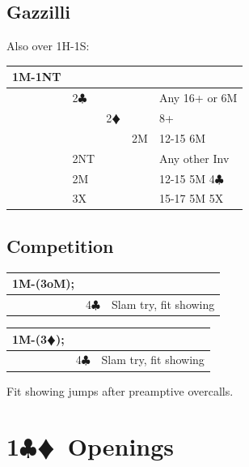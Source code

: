\documentclass[a4paper]{article}
\newcommand{\BC}{\textcolor{OliveGreen}{$\clubsuit$}}
\newcommand{\BD}{\textcolor{RedOrange}{$\vardiamondsuit$}}
\newcommand{\pdfc}{\texorpdfstring{\BC{}}{C}}
\newcommand{\pdfd}{\texorpdfstring{\BD{}}{D}}
\begin{document}
\subsection{Gazzilli}

Also over 1H-1S:
\bigbreak
\begingroup
\renewcommand{\arraystretch}{1.4}
\begin{xltabular}{\linewidth}{|l|l|l|l|X|}
\hline
1M-1NT &  &  &  &  \\
\hline
 & 2\BC &  &  & Any 16+ or 6M \\
\hline
 &  & 2\BD &  & 8+ \\
\hline
 &  &  & 2M & 12-15 6M \\
\hline
 & 2NT &  &  & Any other Inv \\
\hline
 & 2M &  &  & 12-15 5M 4\BC \\
\hline
 & 3X &  &  & 15-17 5M 5X \\
\hline
\end{xltabular}
\endgroup
\bigbreak
\subsection{Competition}

\begingroup
\renewcommand{\arraystretch}{1.4}
\begin{xltabular}{\linewidth}{|l|l|X|}
\hline
1M-(3oM); &  &  \\
\hline
 & 4\BC & Slam try, fit showing \\
\hline
\end{xltabular}
\endgroup
\bigbreak
\begingroup
\renewcommand{\arraystretch}{1.4}
\begin{xltabular}{\linewidth}{|l|l|X|}
\hline
1M-(3\BD); &  &  \\
\hline
 & 4\BC & Slam try, fit showing \\
\hline
\end{xltabular}
\endgroup
\bigbreak
Fit showing jumps after preamptive overcalls.
\bigbreak
\section{1\pdfc\pdfd\ Openings}
\end{document}
